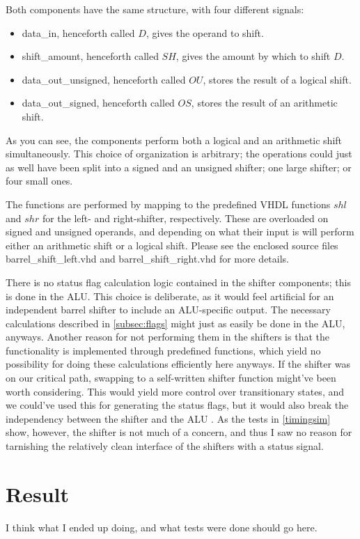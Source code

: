 \documentclass{article}
\begin{document}
Both components have the same structure, with four different signals:
\begin{itemize}
\item data\_in, henceforth called $D$, gives the operand to shift.
\item shift\_amount, henceforth called $SH$, gives the amount by which to shift $D$.
\item data\_out\_unsigned, henceforth called $OU$, stores the result of a logical shift.
\item data\_out\_signed, henceforth called $OS$, stores the result of an arithmetic shift.
\end{itemize}
As you can see, the components perform both a logical and an arithmetic shift simultaneously. This choice of organization is arbitrary; the operations could just as well have been split into a signed and an unsigned shifter; one large shifter; or four small ones. 

The functions are performed by mapping to the predefined VHDL functions $shl$ and $shr$ for the left- and right-shifter, respectively. These are overloaded on signed and unsigned operands, and depending on what their input is will perform either an arithmetic shift or a logical shift. Please see the enclosed source files barrel_shift_left.vhd and barrel_shift_right.vhd for more details. 

There is no status flag calculation logic contained in the shifter components; this is done in the ALU. This choice is deliberate, as it would feel artificial for an independent barrel shifter to include an ALU-specific output. The necessary calculations described in \autoref{subsec:flags} might just as easily be done in the ALU, anyways. Another reason for not performing them in the shifters is that the functionality is implemented through predefined functions, which yield no possibility for doing these calculations efficiently here anyways. If the shifter was on our critical path, swapping to a self-written shifter function might've been worth considering. This would yield more control over transitionary states, and we could've used this for generating the status flags, but it would also break the independency between the shifter and the ALU . As the tests in \autoref{timingsim} show, however, the shifter is not much of a concern, and thus I saw no reason for tarnishing the relatively clean interface of the shifters with a status signal.

\section{Result}
\label{sec:result}
I think what I ended up doing, and what tests were done should go here.
\end{document}
